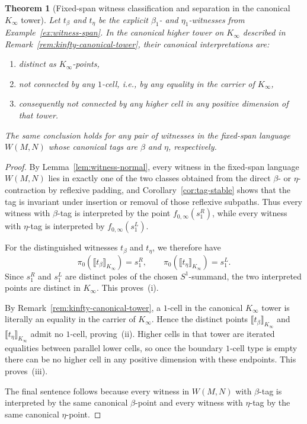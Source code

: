 \documentclass[webpdf,traditional,large,numbered]{oup-authoring-template}
\theoremstyle{thmstyleone}%
\newtheorem{theorem}{Theorem}[section]
\theoremstyle{thmstyletwo}%
\theoremstyle{thmstylethree}%
\newcommand{\Kinf}{K_\infty}
\begin{document}
\begin{theorem}[Fixed-span witness classification and separation in the canonical $\Kinf$ tower]
\label{thm:C}
  Let $t_\beta$ and $t_\eta$ be the explicit $\beta_1$- and $\eta_1$-witnesses
  from Example~\ref{ex:witness-span}.  In the canonical higher tower on
  $\Kinf$ described in Remark~\ref{rem:kinfty-canonical-tower}, their canonical
  interpretations are:
  \begin{enumerate}[label=(\roman*)]
    \item distinct as $\Kinf$-points,
    \item not connected by any $1$-cell, i.e., by any equality in the carrier of
      $\Kinf$,
    \item consequently not connected by any higher cell in any positive
      dimension of that tower.
  \end{enumerate}
  The same conclusion holds for any pair of witnesses in the fixed-span
  language $W(M,N)$ whose canonical tags are $\beta$ and $\eta$,
  respectively.
\end{theorem}

\begin{proof}
  By Lemma~\ref{lem:witness-normal}, every witness in the fixed-span language
  $W(M,N)$ lies in exactly one of the two classes obtained from the direct
  $\beta$- or $\eta$-contraction by reflexive padding, and
  Corollary~\ref{cor:tag-stable} shows that the tag is invariant under
  insertion or removal of those reflexive subpaths.  Thus every witness with
  $\beta$-tag is interpreted by the point $f_{0,\infty}(s^R_1)$, while every
  witness with $\eta$-tag is interpreted by $f_{0,\infty}(s^L_1)$.

  For the distinguished witnesses $t_\beta$ and $t_\eta$, we therefore have
  \[
    \pi_0(\llbracket t_\beta\rrbracket_{\Kinf})=s^R_1,
    \qquad
    \pi_0(\llbracket t_\eta\rrbracket_{\Kinf})=s^L_1.
  \]
  Since $s^R_1$ and $s^L_1$ are distinct poles of the chosen $S^1$-summand,
  the two interpreted points are distinct in $\Kinf$.  This proves~(i).

  By Remark~\ref{rem:kinfty-canonical-tower}, a $1$-cell in the canonical
  $\Kinf$ tower is literally an equality in the carrier of $\Kinf$.  Hence the
  distinct points $\llbracket t_\beta\rrbracket_{\Kinf}$ and
  $\llbracket t_\eta\rrbracket_{\Kinf}$ admit no $1$-cell, proving~(ii).
  Higher cells in that tower are iterated equalities between parallel lower
  cells, so once the boundary $1$-cell type is empty there can be no higher cell
  in any positive dimension with these endpoints.  This proves~(iii).

  The final sentence follows because every witness in $W(M,N)$ with $\beta$-tag
  is interpreted by the same canonical $\beta$-point and every witness with
  $\eta$-tag by the same canonical $\eta$-point.
\end{proof}
\end{document}
